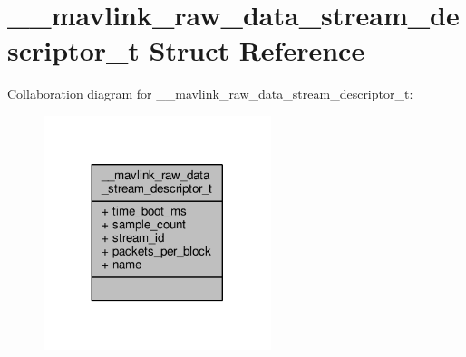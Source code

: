 \hypertarget{struct____mavlink__raw__data__stream__descriptor__t}{\section{\+\_\+\+\_\+mavlink\+\_\+raw\+\_\+data\+\_\+stream\+\_\+descriptor\+\_\+t Struct Reference}
\label{struct____mavlink__raw__data__stream__descriptor__t}
}


Collaboration diagram for \+\_\+\+\_\+mavlink\+\_\+raw\+\_\+data\+\_\+stream\+\_\+descriptor\+\_\+t\+:
\nopagebreak
\begin{figure}[H]
\begin{center}
\leavevmode
\includegraphics[width=188pt]{struct____mavlink__raw__data__stream__descriptor__t__coll__graph}
\end{center}
\end{figure}
